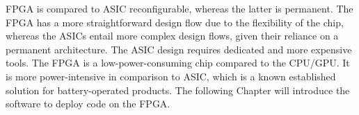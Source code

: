 FPGA is compared to ASIC reconfigurable, whereas the latter is permanent. The FPGA has a more straightforward design flow due to the flexibility of the chip, whereas the ASICs entail more complex design flows, given their reliance on a permanent architecture. The ASIC design requires dedicated and more expensive tools. The FPGA is a low-power-consuming chip compared to the CPU/GPU. It is more power-intensive in comparison to ASIC, which is a known established solution for battery-operated products.
The following Chapter will introduce the software to deploy code on the FPGA.
